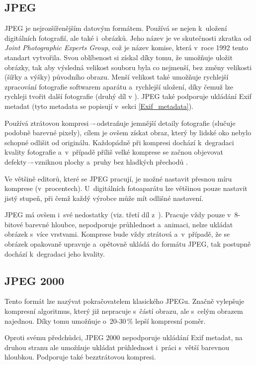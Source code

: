 \subsection*{JPEG}
JPEG je nejrozšířenějším datovým formátem. Používá se nejen k~uložení digitálních fotografií, ale také i~obrázků. Jeho název je ve skutečnosti zkratka od \textit{Joint Photographic Experts Group}, což je název komise, která v~roce 1992 tento standart vytvořila. Svou oblíbenost si získal díky tomu, že umožňuje uložit obrázky, tak aby výsledná velikost souboru byla co nejmenší, bez změny velikosti (šířky a výšky) původního obrazu. Menší velikost také umožňuje rychlejší zpracování fotografie softwarem aparátu a~rychlejší uložení, díky čemuž lze rychleji tvořit další fotografie (druhý díl v \cite{datove_formaty_web}). JPEG také podporuje ukládání Exif metadat (tyto metadata se popisují v~sekci \ref{Exif_metadata}).

Používá ztrátovou kompresi\,–-\,odstraňuje jemnější detaily fotografie (slučuje podobně barevné pixely), cílem je ovšem získat obraz, který by lidské oko nebylo schopné odlišit od originálu. Každopádně při kompresi dochází k~degradaci kvality fotografie a~v~případě příliš velké komprese se začnou objevovat defekty\,–-\,vzniknou plochy a~pruhy bez hladkých přechodů \cite{digi_foto_book2}.

Ve většině editorů, které se JPEG pracují, je možné nastavit přesnou míru komprese (v~procentech). U~digitálních fotoaparátu lze většinou pouze nastavit jistý stupeň, při čemž každý výrobce může mít odlišné nastavení.

JPEG má ovšem i~své nedostatky (viz. třetí díl z~\cite{datove_formaty_web}). Pracuje vždy pouze v~8-bitové barevné hloubce, nepodporuje průhlednost a~animaci, nelze ukládat obrázek s~více vrstvami. Komprese bude vždy ztrátová a~v~případě, že se obrázek opakovaně upravuje a~opětovně ukládá do formátu JPEG, tak postupně dochází k~degradaci jeho kvality.

\subsection*{JPEG 2000}
Tento formát lze nazývat pokračovatelem klasického JPEGu. Značně vylepšuje kompresní algoritmus, který již nepracuje s~částí obrazu, ale s~celým obrazem najednou. Díky tomu umožňuje o~20-30\,\% lepší kompresní poměr.

Oproti svému předchůdci, JPEG 2000 nepodporuje ukládání Exif metadat, na druhou stranu ale umožňuje ukládat průhlednost i~práci s~větší barevnou hloubkou. Podporuje také bezztrátovou kompresi.

